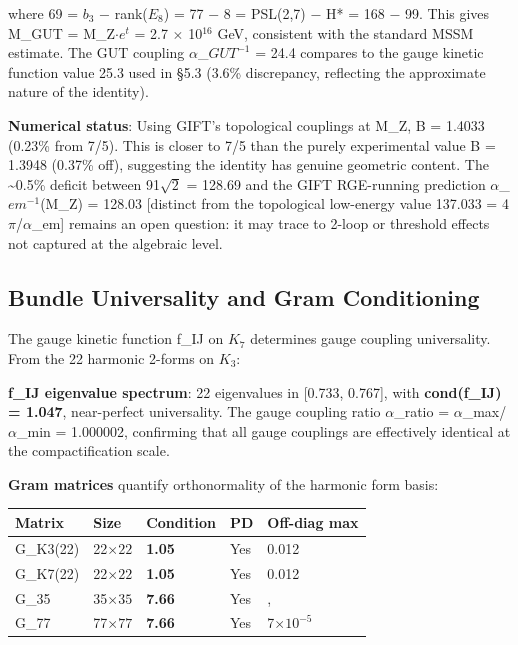 \documentclass[11pt,a4paper]{article}
\begin{document}
where 69 = \(b_{3}\) \(-\) rank(\(E_{8}\)) = 77 \(-\) 8 =
\textbar PSL(2,7)\textbar{} \(-\) H* = 168 \(-\) 99. This gives M\_GUT =
M\_Z\(\cdot\)\(e^{t}\) = 2.7 \(\times\) 10\(^{16}\) GeV, consistent with
the standard MSSM estimate. The GUT coupling \(\alpha\)\_\(GUT^{-1}\) =
24.4 compares to the gauge kinetic function value 25.3 used in §5.3
(3.6\% discrepancy, reflecting the approximate nature of the identity).

\textbf{Numerical status}: Using GIFT's topological couplings at M\_Z, B
= 1.4033 (0.23\% from 7/5). This is closer to 7/5 than the purely
experimental value B = 1.3948 (0.37\% off), suggesting the identity has
genuine geometric content. The \textasciitilde0.5\% deficit between 91$\sqrt{2}$
= 128.69 and the GIFT RGE-running prediction
\(\alpha\)\_\(em^{-1}\)(M\_Z) = 128.03 {[}distinct from the topological
low-energy value 137.033 = 4\(\pi\)/\(\alpha\)\_em{]} remains an open
question: it may trace to 2-loop or threshold effects not captured at
the algebraic level.

\subsection{Bundle Universality and Gram Conditioning}

The gauge kinetic function f\_IJ on \(K_{7}\) determines gauge coupling
universality. From the 22 harmonic 2-forms on \(K_{3}\):

\textbf{f\_IJ eigenvalue spectrum}: 22 eigenvalues in {[}0.733,
0.767{]}, with \textbf{cond(f\_IJ) = 1.047}, near-perfect
universality. The gauge coupling ratio \(\alpha\)\_ratio =
\(\alpha\)\_max/\(\alpha\)\_min = 1.000002, confirming that all gauge
couplings are effectively identical at the compactification scale.

\textbf{Gram matrices} quantify orthonormality of the harmonic form
basis:

\begin{longtable}[]{@{}lllll@{}}
\toprule\noalign{}
Matrix & Size & Condition & PD & Off-diag max \\
\midrule\noalign{}
\endhead
\bottomrule\noalign{}
\endlastfoot
G\_K3(22) & 22\(\times 22\) & \textbf{1.05} & Yes & 0.012 \\
G\_K7(22) & 22\(\times 22\) & \textbf{1.05} & Yes & 0.012 \\
G\_35 & 35\(\times 35\) & \textbf{7.66} & Yes &, \\
G\_77 & 77\(\times 77\) & \textbf{7.66} & Yes & 7\(\times 10^{-5}\) \\
\end{longtable}
\end{document}
